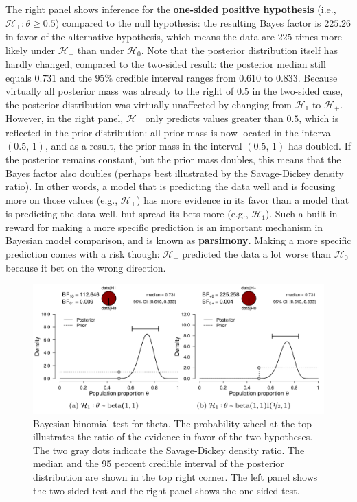 \documentclass[
]{book}
\begin{document}
The right panel shows inference for the \textbf{one-sided positive hypothesis} (i.e., \(\mathcal{H}_+: \theta \geq 0.5\)) compared to the null hypothesis: the resulting Bayes factor is \(225.26\) in favor of the alternative hypothesis, which means the data are \(225\) times more likely under \(\mathcal{H}_+\) than under \(\mathcal{H}_0\).
Note that the posterior distribution itself has hardly changed, compared to the two-sided result: the posterior median still equals \(0.731\) and the \(95\%\) credible interval ranges from \(0.610\) to \(0.833\).
Because virtually all posterior mass was already to the right of \(0.5\) in the two-sided case, the posterior distribution was virtually unaffected by changing from \(\mathcal{H}_1\) to \(\mathcal{H}_+\).
However, in the right panel, \(\mathcal{H}_+\) only predicts values greater than \(0.5\), which is reflected in the prior distribution: all prior mass is now located in the interval \((0.5\text{, } 1)\), and as a result, the prior mass in the interval \((0.5\text{, } 1)\) has doubled. If the posterior remains constant, but the prior mass doubles, this means that the Bayes factor also doubles (perhaps best illustrated by the Savage-Dickey density ratio).
In other words, a model that is predicting the data well and is focusing more on those values (e.g., \(\mathcal{H}_+\)) has more evidence in its favor than a model that is predicting the data well, but spread its bets more (e.g., \(\mathcal{H}_1\)). Such a built in reward for making a more specific prediction is an important mechanism in Bayesian model comparison, and is known as \textbf{parsimony}. Making a more specific prediction comes with a risk though: \(\mathcal{H}_-\) predicted the data a lot worse than \(\mathcal{H}_0\) because it bet on the wrong direction.

\begin{figure}

{\centering \includegraphics[width=0.95\linewidth]{Figures/beerTasteResultsPriorPostOneTwoSided} 

}

\caption{Bayesian binomial test for theta. The probability wheel at the top illustrates the ratio of the evidence in favor of the two hypotheses. The two gray dots indicate the Savage-Dickey density ratio. The median and the 95 percent credible interval of the posterior distribution are shown in the top right corner. The left panel shows the two-sided test and the right panel shows the one-sided test.}\label{fig:jasp-beer-result}
\end{figure}
\end{document}
